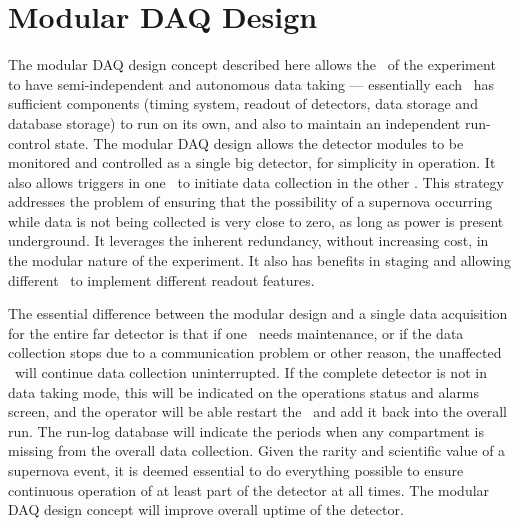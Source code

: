 
\section{Modular DAQ Design}
\label{sec:daq_upper}

The modular DAQ design concept described here allows the
\COMPARTMENTS\ of the experiment to have semi-independent and
autonomous data taking --- essentially each \COMPARTMENT\ has sufficient
components (timing system, readout of detectors, data storage and
database storage) to run on its own, %
and also to maintain an independent
run-control state.  The modular DAQ design allows the %
detector modules to
be monitored and controlled as a single big detector, for simplicity
in operation.  It also allows triggers in one \COMPARTMENT\ to initiate
data collection in the other \COMPARTMENTS.
This strategy addresses the problem of ensuring that the possibility
of a supernova occurring while data is not being collected is very
close to zero, as long as power is present
underground.  It leverages the inherent redundancy, without
increasing cost, in the modular nature of the experiment.
It also has benefits in staging and allowing different \COMPARTMENTS\ 
to implement different readout features.

The essential difference between the modular design and a single data
acquisition for the entire far detector is that if one \COMPARTMENT\
needs maintenance, or if the data collection stops due to a
communication problem or other reason, the unaffected \COMPARTMENTS\ will
continue data collection uninterrupted.  If the complete detector is
not in data taking mode, this will be indicated on the operations
status and alarms screen, and the operator will be able restart the
\COMPARTMENT\ and add it back into the overall run.  The run-log
database will indicate the periods when any compartment is missing
from the overall data collection. 
Given the rarity and scientific value of a supernova event, it is deemed
essential to do everything possible to ensure continuous operation of at least part of the detector at all times.
The modular DAQ design
concept will improve overall uptime of the detector.

